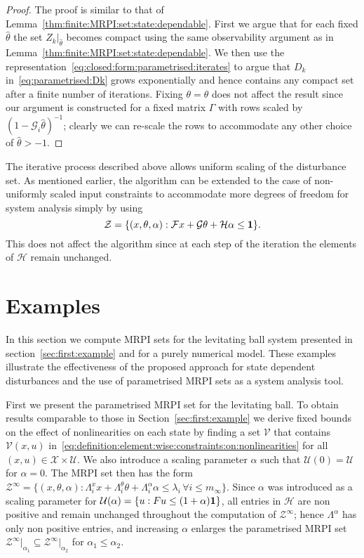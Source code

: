 \documentclass[letterpaper, 10pt, conference]{ieeeconf} %
\begin{document}
\begin{proof}
The proof is similar to that of Lemma~\ref{thm:finite:MRPI:set:state:dependable}.
First we argue that for each fixed $\hat\theta$ the set $Z_k\vert_{\hat\theta}$ becomes compact using the same
observability argument as in Lemma~\ref{thm:finite:MRPI:set:state:dependable}.
We then use the representation~\eqref{eq:closed:form:parametrised:iterates} to argue that $D_k$ 
in~\eqref{eq:parametrised:Dk} grows exponentially and hence contains any compact set after a finite number
of iterations. Fixing $\theta=\hat\theta$ does not affect the result since
our argument is constructed for a fixed matrix $\Gamma$ with rows scaled by 
$(1-\mathcal G_i\hat\theta)^{-1}$; clearly we can re-scale the rows to accommodate any other choice of $\hat\theta>-1$.
\end{proof}

The iterative process described above allows uniform scaling of the disturbance set. As mentioned earlier, the 
algorithm can be extended to the case of non-uniformly scaled input constraints to accommodate more degrees of freedom for 
system analysis simply by using 
%
\[
\mathcal Z = \{(x,\theta,\alpha): \mathcal F x + \mathcal G\theta + 
\mathcal H \alpha \leq {\bf{1}}\}.
\]
%
This does not affect the algorithm since at each step of the iteration 
the elements of $\mathcal H$ remain unchanged. 
%
%
%
%
%
%
\section{Examples}\label{sec:second:example}
%
%
In this section we compute MRPI sets for the levitating ball system presented in 
section~\ref{sec:first:example} and for a purely numerical model. These examples illustrate the effectiveness 
of the proposed approach for state dependent disturbances and the use of parametrised MRPI sets as a system analysis tool. 

First we present the parametrised MRPI
set for the levitating ball. To obtain results comparable to those in Section~\ref{sec:first:example} we derive fixed bounds
on the effect of nonlinearities on each state by finding a set $\mathcal V$ that contains $\mathcal V(x,u)$ 
in~\eqref{eq:definition:element:wise:constraints:on:nonlinearities} for all $(x,u)\in\mathcal X\times\mathcal U$. 
We also introduce
a scaling parameter $\alpha$ such that $\mathcal U(0)=\mathcal U$ for $\alpha=0$. The MRPI set then has the form $\mathcal Z^\infty=\{(x,\theta,\alpha): \Lambda_i^x x + \Lambda_i^\theta \theta + \Lambda_i^\alpha \alpha\leq
\lambda_i\,\forall i\leq m_\infty\}$. Since $\alpha$ was introduced as a scaling parameter
for $\mathcal U(\alpha)=\{u: Fu\leq (1+\alpha){\bf{1}}\}$, all entries in $\mathcal H$ are non positive and
remain unchanged throughout the computation of $\mathcal Z^\infty$; hence $\Lambda^\alpha$ has only non
positive entries, and increasing $\alpha$ enlarges the parametrised MRPI set $\mathcal Z^\infty\vert_{\alpha_1}
\subseteq\mathcal Z^\infty\vert_{\alpha_2}$ for $\alpha_1\leq\alpha_2$.
\end{document}
